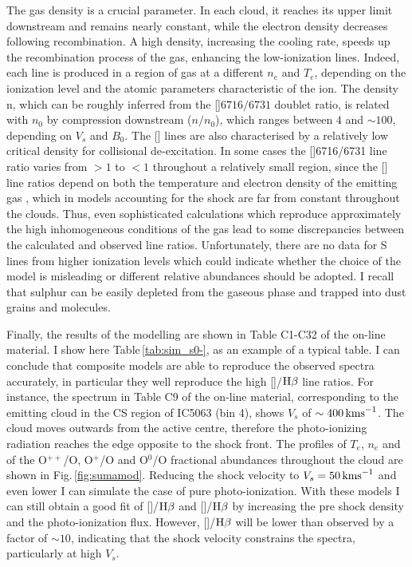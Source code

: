 \documentclass[../thesis.tex]{subfiles}
\begin{document}
The gas density is a crucial parameter. 
In each cloud, it reaches its upper limit downstream and remains nearly constant, while the electron density decreases following recombination. 
A high density, increasing the cooling rate, speeds up the recombination process of the gas, enhancing the low-ionization lines.
Indeed, each line is produced in a region of gas at a different $n_e$ and $T_e$, depending on the ionization level and the atomic parameters characteristic of the ion. 
The density n, which can be roughly inferred from the []$6716/6731$ doublet ratio, is related with $n_0$ by compression downstream ($n/n_0$), which ranges between $4$ and $\sim100$, depending on $V_s$ and $B_0$. 
The [] lines are also characterised by a relatively low critical density for collisional de-excitation.  
In some cases the []6716/6731 line ratio varies from $> 1$ to $< 1$ throughout a relatively small region, since the [] line ratios depend on both the temperature and electron density of the emitting gas \citep{OsterbrockAGN}, which in models accounting for the shock are far from constant throughout the clouds.
Thus, even sophisticated calculations which reproduce approximately the high inhomogeneous conditions of the gas
lead to some discrepancies between the calculated and observed line ratios.
Unfortunately, there are no data for S lines from higher ionization levels which could indicate whether the choice of the model is misleading or different relative abundances should be adopted. 
I recall that sulphur can be easily depleted from the gaseous phase and trapped into dust grains and molecules.

Finally, the results of the modelling are shown in Table C1-C32 of the on-line material.
I show here Table\,\ref{tab:sim_s0-}, as an example of a typical table. 
I can conclude that composite models are able to reproduce the observed spectra accurately, in particular they well reproduce the high []/$\Hb$ line ratios.
For instance, the spectrum in Table C9 of the on-line material, corresponding to the emitting cloud in the CS region of IC5063 (bin 4), shows $V_s$ of $\sim 400\,\si{\kms}$. 
The cloud moves outwards from the active centre, therefore the photo-ionizing radiation reaches the edge opposite to the shock front.
The profiles of $T_e$, $n_e$ and of the O$^{++}$/O, O$^+$/O and O$^0$/O fractional abundances throughout the cloud are shown in Fig.\,\ref{fig:sumamod}.
Reducing the shock velocity to $V_s =50\,\si{\kms}$ and even lower I can simulate the case of pure photo-ionization.
With these models I can still obtain a good fit of []/$\Hb$ and []/$\Hb$ by increasing the pre shock density and the photo-ionization flux.
However,  []/$\Hb$  will be lower than observed by a factor of $\sim 10$, indicating that the shock velocity constrains the spectra, particularly at high $V_s$.
\end{document}
